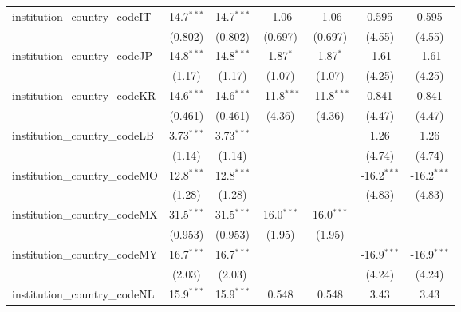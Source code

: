 \begin{tabular}{lcccccc}
   institution\_country\_codeIT          & 14.7$^{***}$  & 14.7$^{***}$  & -1.06         & -1.06         & 0.595         & 0.595\\   
                                         & (0.802)       & (0.802)       & (0.697)       & (0.697)       & (4.55)        & (4.55)\\   
   institution\_country\_codeJP          & 14.8$^{***}$  & 14.8$^{***}$  & 1.87$^{*}$    & 1.87$^{*}$    & -1.61         & -1.61\\   
                                         & (1.17)        & (1.17)        & (1.07)        & (1.07)        & (4.25)        & (4.25)\\   
   institution\_country\_codeKR          & 14.6$^{***}$  & 14.6$^{***}$  & -11.8$^{***}$ & -11.8$^{***}$ & 0.841         & 0.841\\   
                                         & (0.461)       & (0.461)       & (4.36)        & (4.36)        & (4.47)        & (4.47)\\   
   institution\_country\_codeLB          & 3.73$^{***}$  & 3.73$^{***}$  &               &               & 1.26          & 1.26\\   
                                         & (1.14)        & (1.14)        &               &               & (4.74)        & (4.74)\\   
   institution\_country\_codeMO          & 12.8$^{***}$  & 12.8$^{***}$  &               &               & -16.2$^{***}$ & -16.2$^{***}$\\   
                                         & (1.28)        & (1.28)        &               &               & (4.83)        & (4.83)\\   
   institution\_country\_codeMX          & 31.5$^{***}$  & 31.5$^{***}$  & 16.0$^{***}$  & 16.0$^{***}$  &               &   \\   
                                         & (0.953)       & (0.953)       & (1.95)        & (1.95)        &               &   \\   
   institution\_country\_codeMY          & 16.7$^{***}$  & 16.7$^{***}$  &               &               & -16.9$^{***}$ & -16.9$^{***}$\\   
                                         & (2.03)        & (2.03)        &               &               & (4.24)        & (4.24)\\   
   institution\_country\_codeNL          & 15.9$^{***}$  & 15.9$^{***}$  & 0.548         & 0.548         & 3.43          & 3.43\\   

\end{tabular}
